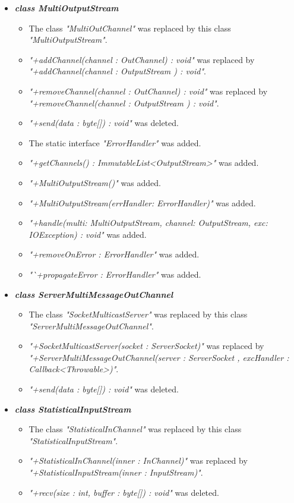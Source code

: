 \documentclass[a4paper,10pt]{scrartcl}
\begin{document}
\begin{itemize}
   \item \textbf{\textit{class MultiOutputStream}}
  \begin{itemize}
	 \item The class \textit{"MultiOutChannel"} was replaced by this class \textit{"MultiOutputStream"}.
	 \item \textit{"+addChannel(channel : OutChannel) : void"} was replaced by 
	 \textit{"+addChannel(channel : OutputStream ) : void"}.
	 \item \textit{"+removeChannel(channel : OutChannel) : void"} was replaced by 
	 \textit{"+removeChannel(channel : OutputStream ) : void"}.
	 \item \textit{"+send(data : byte[]) : void"} was deleted.
	 \item The static interface \textit{"ErrorHandler"} was added.
	 \item \textit{"+getChannels() : ImmutableList<OutputStream>"} was added.
	 \item \textit{"+MultiOutputStream()"} was added.
	 \item \textit{"+MultiOutputStream(errHandler: ErrorHandler)"} was added.
	 \item \textit{"+handle(multi: MultiOutputStream, channel: OutputStream, exc: IOException) : void"} was added.
	 \item \textit{"+removeOnError : ErrorHandler"} was added.
	 \item \textit{"`+propagateError : ErrorHandler"} was added.
	\end{itemize}
	
   \item \textit{\textbf{class ServerMultiMessageOutChannel}}
	\begin{itemize}
	 \item The class \textit{"SocketMulticastServer"} was replaced by this class \textit{"ServerMultiMessageOutChannel"}.
	 \item \textit{"+SocketMulticastServer(socket : ServerSocket)"} was replaced by 
	 \textit{"+ServerMultiMessageOutChannel(server : ServerSocket , excHandler : Callback<Throwable>)"}.
	 \item \textit{"+send(data : byte[]) : void"} was deleted.
	\end{itemize}
	 
   \item \textbf{\textit{class StatisticalInputStream}}
	\begin{itemize}
	\item The class \textit{"StatisticalInChannel"} was replaced by this class \textit{"StatisticalInputStream"}.
	\item \textit{"+StatisticalInChannel(inner : InChannel)"} was replaced by 
	\textit{"+StatisticalInputStream(inner : InputStream)"}.
	\item \textit{"+recv(size : int, buffer : byte[]) : void"} was deleted.
	\end{itemize}
	

\end{itemize}
\end{document}

